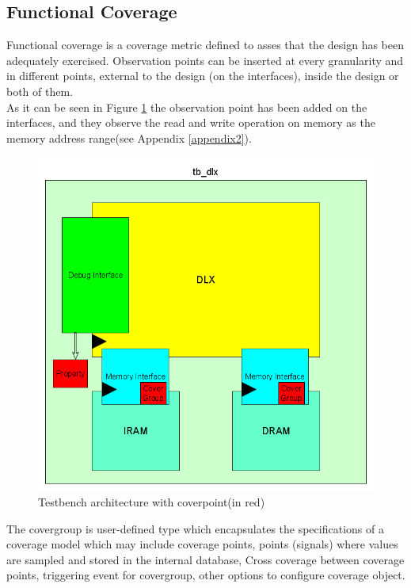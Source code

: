 \subsection{Functional Coverage}
Functional coverage is a coverage metric defined to asses that the design has been adequately exercised\cite{paper:2}.
Observation points can be inserted at every granularity and in different points, external to the design (on the interfaces), inside the design or both of them.\\
As it can be seen in Figure \ref{fig:dlxtbcp} the observation point has been added on the interfaces, and they observe the read and write operation on memory as the memory address range(see Appendix \ref{appendix2}).

\begin{figure}[!htbp]
\centering
\captionsetup{justification=centering}
\includegraphics[scale=0.35,angle=0]{./chapters/figures/tb_dlx_cg.png}
\caption{Testbench architecture with coverpoint(in red)}
\label{fig:dlxtbcp}
\end{figure}
The covergroup is user-defined type which encapsulates the specifications of a coverage model which may include coverage points, points (signals) where values are sampled and stored in the internal database, Cross coverage between coverage points, triggering event for covergroup, other options to configure coverage object.\\

